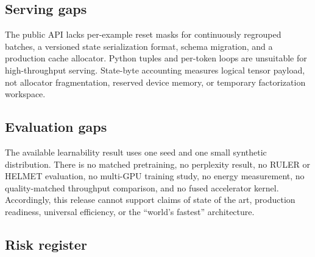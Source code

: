\subsection{Serving gaps}

The public API lacks per-example reset masks for continuously regrouped
batches, a versioned state serialization format, schema migration, and a
production cache allocator. Python tuples and per-token loops are unsuitable
for high-throughput serving. State-byte accounting measures logical tensor
payload, not allocator fragmentation, reserved device memory, or temporary
factorization workspace.

\subsection{Evaluation gaps}

The available learnability result uses one seed and one small synthetic
distribution. There is no matched pretraining, no perplexity result, no RULER
or HELMET evaluation, no multi-GPU training study, no energy measurement, no
quality-matched throughput comparison, and no fused accelerator kernel.
Accordingly, this release cannot support claims of state of the art,
production readiness, universal efficiency, or the ``world's fastest''
architecture.

\subsection{Risk register}

